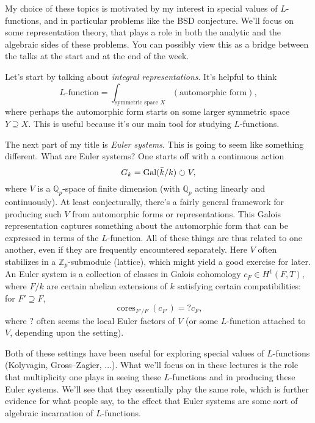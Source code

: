 \documentclass[reqno]{amsart} 
\begin{document}
My choice of these topics is motivated by my interest in special values of $L$-functions, and in particular problems like the BSD conjecture.  We'll focus on some representation theory, that plays a role in both the analytic and the algebraic sides of these problems.  You can possibly view this as a bridge between the talks at the start and at the end of the week.

Let's start by talking about \emph{integral representations}.  It's helpful to think
\begin{equation*}
  \text{$L$-function} =
  \int_{\text{symmetric space } X}
  (\text{automorphic form}),
\end{equation*}
where perhaps the automorphic form starts on some larger symmetric space $Y \supseteq X$.  This is useful because it's our main tool for studying $L$-functions.

The next part of my title is \emph{Euler systems}.  This is going to seem like something different.  What are Euler systems?  One starts off with a continuous action
\begin{equation*}
  G_k = \operatorname{Gal}(\bar{k} / k) \circlearrowright V,
\end{equation*}
where $V$ is a $\mathbb{Q}_p$-space of finite dimension (with $\mathbb{Q}_p$ acting linearly and continuously).  At least conjecturally, there's a fairly general framework for producing such $V$ from automorphic forms or representations.  This Galois representation captures something about the automorphic form that can be expressed in terms of the $L$-function.  All of these things are thus related to one another, even if they are frequently encountered separately.  Here $V$ often stabilizes in a $\mathbb{Z}_p$-submodule (lattice), which might yield a good exercise for later.  An Euler system is a collection of classes in Galois cohomology $c_F \in H^1(F, T)$, where $F / k$ are certain abelian extensions of $k$ satisfying certain compatibilities: for $F' \supseteq F$,
\begin{equation*}
  \operatorname{cores}_{F' / F}(c_{F '}) = ? c_F,
\end{equation*}
where $?$ often seems the local Euler factors of $V$ (or some $L$-function attached to $V$, depending upon the setting).

Both of these settings have been useful for exploring special values of $L$-functions (Kolyvagin, Gross--Zagier, ...).  What we'll focus on in these lectures is the role that multiplicity one plays in seeing these $L$-functions and in producing these Euler systems.  We'll see that they essentially play the same role, which is further evidence for what people say, to the effect that Euler systems are some sort of algebraic incarnation of $L$-functions.
\end{document}
